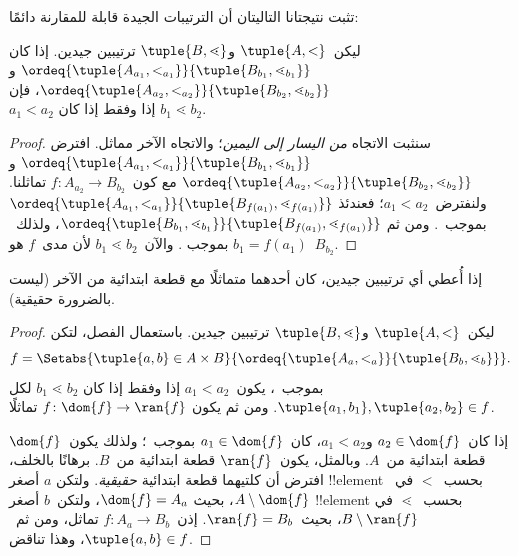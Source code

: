 \documentclass[../../../include/open-logic-section]{subfiles}
\begin{document}
تثبت نتيجتانا التاليتان أن الترتيبات الجيدة قابلة للمقارنة دائمًا:

\begin{lem}
ليكن~$\tuple{A, <}$ و$\tuple{B, \lessdot}$ ترتيبين جيدين. إذا كان
$\ordeq{\tuple{A_{a_1}, <_{a_1}}}{\tuple{B_{b_1}, \lessdot_{b_1}}}$
و$\ordeq{\tuple{A_{{a_2}}, <_{a_2}}}{\tuple{B_{{b_2}},
\lessdot_{b_2}}}$، فإن ${a_1} < {a_2} \text{ إذا وفقط إذا كان }
{b_1} \lessdot {b_2}$.
\end{lem}

\begin{proof}
سنثبت الاتجاه \emph{من اليسار إلى اليمين}؛ والاتجاه الآخر مماثل.
افترض
$\ordeq{\tuple{A_{a_1}, <_{a_1}}}{\tuple{B_{b_1},
\lessdot_{b_1}}}$ و
$\ordeq{\tuple{A_{{a_2}}, <_{a_2}}}{\tuple{B_{{b_2}},
\lessdot_{b_2}}}$ مع كون~$f \colon A_{{a_2}} \to B_{{b_2}}$
تماثلنا. ولنفترض~${a_1} < {a_2}$؛ فعندئذ
$\ordeq{\tuple{A_{a_1}, <_{a_1}}}{\tuple{B_{f({a_1})},
\lessdot_{f({a_1})}}}$ بموجب~. ومن ثم
$\ordeq{\tuple{B_{b_1}, \lessdot_{b_1}}}{\tuple{B_{f({a_1})},
\lessdot_{f({a_1})}}}$، ولذلك~${b_1} = f({a_1})$ بموجب
. والآن~${b_1} \lessdot {b_2}$ لأن مدى~$f$
هو~$B_{{b_2}}$.
\end{proof}

\begin{thm}
إذا أُعطي أي ترتيبين جيدين، كان أحدهما متماثلًا مع قطعة ابتدائية من
الآخر (ليست بالضرورة حقيقية).
\end{thm}

\begin{proof}
ليكن~$\tuple{A, <}$ و$\tuple{B, \lessdot}$ ترتيبين جيدين. باستعمال
الفصل، لتكن
\[
	f = \Setabs{\tuple{a, b} \in A \times B}{
		\ordeq{\tuple{A_a, <_a}}{\tuple{B_b, \lessdot_b}}}.
\]
بموجب~، يكون~$a_1 < a_2$ إذا وفقط إذا كان
$b_1 \lessdot b_2$ لكل
$\tuple{a_1, b_1}, \tuple{a_2, b_2} \in f$. ومن ثم يكون
$f \colon \dom{f} \to \ran{f}$ تماثلًا.

إذا كان~$a_2 \in \dom{f}$ و$a_1 < a_2$، كان~$a_1 \in \dom{f}$
بموجب~؛ ولذلك يكون~$\dom{f}$ قطعة
ابتدائية من~$A$. وبالمثل، يكون~$\ran{f}$ قطعة ابتدائية من~$B$.
برهانًا بالخلف، افترض أن كلتيهما قطعة ابتدائية \emph{حقيقية}. ولتكن
$a$ أصغر !!{element} بحسب~$<$ في~$A \setminus \dom{f}$، بحيث
$\dom{f} = A_a$، ولتكن~$b$ أصغر !!{element} بحسب~$\lessdot$ في
$B \setminus \ran{f}$، بحيث~$\ran{f} = B_b$.
إذن~$f \colon A_a \to B_b$ تماثل، ومن ثم~$\tuple{a, b} \in f$،
وهذا تناقض.
\end{proof}
\end{document}
